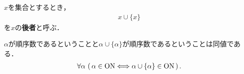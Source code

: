 	\begin{screen}
		\begin{dfn}[後者]
			$x$を集合とするとき，
			\begin{align}
				x \cup \{x\}
			\end{align}
			を$x$の{\bf 後者}と呼ぶ．
		\end{dfn}
	\end{screen}
	
	\begin{screen}
		\begin{thm}[順序数の後者は順序数である]\label{thm:latter_element_is_ordinal}
			$\alpha$が順序数であるということと$\alpha \cup \{\alpha\}$が順序数であるということは同値である．
			\begin{align}
				\forall \alpha\, \left(\, \alpha \in \mathrm{ON} \Longleftrightarrow \alpha \cup \{\alpha\} \in \mathrm{ON}\, \right).
			\end{align}
		\end{thm}
	\end{screen}
	
